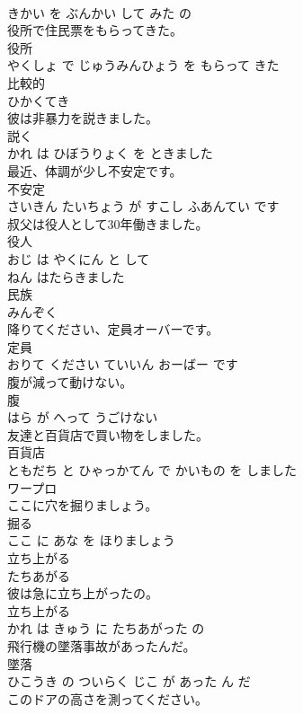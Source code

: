 \documentclass[8pt]{extreport}
\begin{document}
\begin{CJK}{UTF8}{min}
\\	きかい を ぶんかい して みた の			
\\	役所で住民票をもらってきた。	
\\	役所 
\\	やくしょ で じゅうみんひょう を もらって きた			
\\	比較的	
\\	ひかくてき			
\\	彼は非暴力を説きました。	
\\	説く 
\\	かれ は ひぼうりょく を ときました			
\\	最近、体調が少し不安定です。	
\\	不安定 
\\	さいきん たいちょう が すこし ふあんてい です			
\\	叔父は役人として30年働きました。	
\\	役人 
\\	おじ は やくにん と して 
\\	ねん はたらきました			
\\	民族	
\\	みんぞく			
\\	降りてください、定員オーバーです。	
\\	定員 
\\	おりて ください ていいん おーばー です			
\\	腹が減って動けない。	
\\	腹 
\\	はら が へって うごけない			
\\	友達と百貨店で買い物をしました。	
\\	百貨店 
\\	ともだち と ひゃっかてん で かいもの を しました			
\\	ワープロ	
\\	ここに穴を掘りましょう。	
\\	掘る 
\\	ここ に あな を ほりましょう			
\\	立ち上がる	
\\	たちあがる			
\\	彼は急に立ち上がったの。	
\\	立ち上がる 
\\	かれ は きゅう に たちあがった の			
\\	飛行機の墜落事故があったんだ。	
\\	墜落 
\\	ひこうき の ついらく じこ が あった ん だ			
\\	このドアの高さを測ってください。	

\end{CJK}
\end{document}
